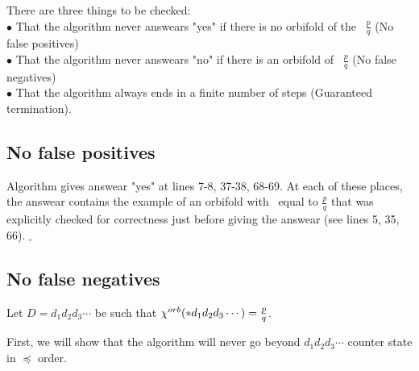 There are three things to be checked: \\
$\bullet$ That the algorithm never answears "yes" if there is no orbifold of the \Eoc\ 
$\frac{p}{q}$ (No false positives)\\
$\bullet$ That the algorithm never answears "no" if there is an orbifold of \Eoc\ 
$\frac{p}{q}$ (No false negatives)\\ 
$\bullet$ That the algorithm always ends in a finite number of steps (Guaranteed termination). 








\subsection{No false positives}
Algorithm gives answear "yes" at lines 7-8, 37-38, 68-69. At each of these places, 
the answear contains the example of an orbifold with \Eoc\ equal to $\frac{p}{q}$ that was 
explicitly checked for correctness just before giving the answear (see lines 5, 35, 66). 
$_\square$    
\subsection{No false negatives}
Let $D = d_1d_2d_3\cdots$ be such that ${\chi^{orb}(*d_1d_2d_3\cdots)} = \frac{p}{q}$. 

%

First, we will show that the algorithm will never 
go beyond $d_1d_2d_3\cdots$ counter state in $\preceq$ order. 

